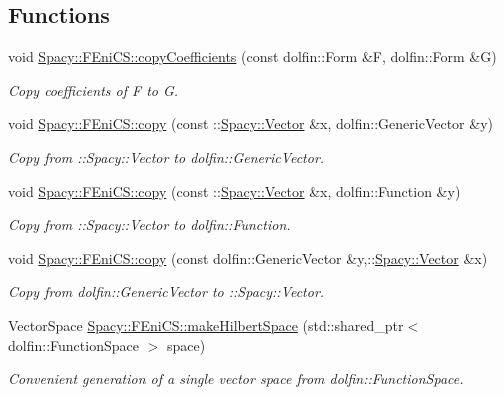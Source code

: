 \subsection*{\-Functions}
\begin{DoxyCompactItemize}
\item 
void \hyperlink{group__FenicsGroup_gab3d4c7c1e91a50e4e816598258b6edce}{\-Spacy\-::\-F\-Eni\-C\-S\-::copy\-Coefficients} (const dolfin\-::\-Form \&\-F, dolfin\-::\-Form \&\-G)
\begin{DoxyCompactList}\small\item\em \-Copy coefficients of \-F to \-G. \end{DoxyCompactList}\item 
void \hyperlink{group__FenicsGroup_ga7f43f0c660d0646adb031b453c536bb0}{\-Spacy\-::\-F\-Eni\-C\-S\-::copy} (const \-::\hyperlink{classSpacy_1_1Vector}{\-Spacy\-::\-Vector} \&x, dolfin\-::\-Generic\-Vector \&y)
\begin{DoxyCompactList}\small\item\em \-Copy from \-:\-:\-Spacy\-:\-:\-Vector to dolfin\-::\-Generic\-Vector. \end{DoxyCompactList}\item 
void \hyperlink{group__FenicsGroup_ga28fb1ebae29e07ec0256bb2331599aa7}{\-Spacy\-::\-F\-Eni\-C\-S\-::copy} (const \-::\hyperlink{classSpacy_1_1Vector}{\-Spacy\-::\-Vector} \&x, dolfin\-::\-Function \&y)
\begin{DoxyCompactList}\small\item\em \-Copy from \-:\-:\-Spacy\-:\-:\-Vector to dolfin\-::\-Function. \end{DoxyCompactList}\item 
void \hyperlink{group__FenicsGroup_ga61c5e45dbb789c155fbf86f8ec288f17}{\-Spacy\-::\-F\-Eni\-C\-S\-::copy} (const dolfin\-::\-Generic\-Vector \&y,\-::\hyperlink{classSpacy_1_1Vector}{\-Spacy\-::\-Vector} \&x)
\begin{DoxyCompactList}\small\item\em \-Copy from dolfin\-::\-Generic\-Vector to \-:\-:\-Spacy\-:\-:\-Vector. \end{DoxyCompactList}\item 
\-Vector\-Space \hyperlink{group__FenicsGroup_ga8b67cb3d0188d2398625595b79e2fa6a}{\-Spacy\-::\-F\-Eni\-C\-S\-::make\-Hilbert\-Space} (std\-::shared\-\_\-ptr$<$ dolfin\-::\-Function\-Space $>$ space)
\begin{DoxyCompactList}\small\item\em \-Convenient generation of a single vector space from dolfin\-::\-Function\-Space. \end{DoxyCompactList}\item 

\end{DoxyCompactItemize}
